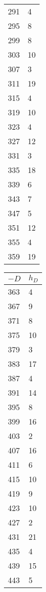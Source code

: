\documentclass[11pt]{report}
\begin{document}
\begin{center}
\begin{tabular}{|ll|}
    291  & 4       \\
    295  & 8       \\
    299  & 8       \\
    303  & 10      \\
    307  & 3       \\
    311  & 19      \\
    315  & 4       \\
    319  & 10      \\
    323  & 4       \\
    327  & 12      \\
    331  & 3       \\
    335  & 18      \\
    339  & 6       \\
    343  & 7       \\
    347  & 5       \\
    351  & 12      \\
    355  & 4       \\
    359  & 19      \\\hline
  \end{tabular}
  \begin{tabular}{|ll|}\hline
    $-D$ & $h_{D}$ \\\hline
    363  & 4       \\
    367  & 9       \\
    371  & 8       \\
    375  & 10      \\
    379  & 3       \\
    383  & 17      \\
    387  & 4       \\
    391  & 14      \\
    395  & 8       \\
    399  & 16      \\
    403  & 2       \\
    407  & 16      \\
    411  & 6       \\
    415  & 10      \\
    419  & 9       \\
    423  & 10      \\
    427  & 2       \\
    431  & 21      \\
    435  & 4       \\
    439  & 15      \\
    443  & 5       \\

\end{tabular}
\end{center}
\end{document}
